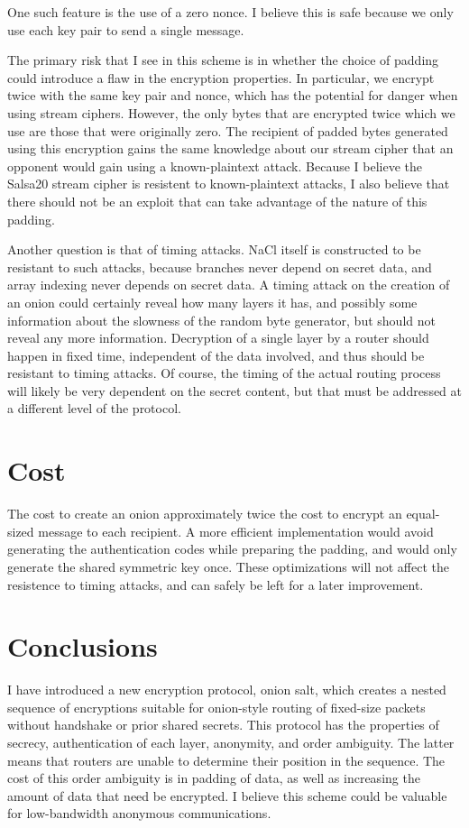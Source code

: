 \documentclass[letterpaper,twocolumn,amsmath,amssymb,pre,aps,10pt]{revtex4-1}
\begin{document}
One such feature is the use of a zero nonce.  I believe this is safe
because we only use each key pair to send a single message.

The primary risk that I see in this scheme is in whether the choice of
padding could introduce a flaw in the encryption properties.  In
particular, we encrypt twice with the same key pair and nonce, which
has the potential for danger when using stream ciphers.  However, the
only bytes that are encrypted twice which we use are those that were
originally zero.  The recipient of padded bytes generated using this
encryption gains the same knowledge about our stream cipher that an
opponent would gain using a known-plaintext attack.  Because I believe
the Salsa20 stream cipher is resistent to known-plaintext attacks, I
also believe that there should not be an exploit that can take
advantage of the nature of this padding.

Another question is that of timing attacks.  NaCl itself is
constructed to be resistant to such attacks, because branches never
depend on secret data, and array indexing never depends on secret
data.  A timing attack on the creation of an onion could certainly
reveal how many layers it has, and possibly some information about the
slowness of the random byte generator, but should not reveal any more
information.  Decryption of a single layer by a router should happen
in fixed time, independent of the data involved, and thus should be
resistant to timing attacks.  Of course, the timing of the actual
routing process will likely be very dependent on the secret content,
but that must be addressed at a different level of the protocol.

\section{Cost}

The cost to create an onion approximately twice the cost to encrypt an
equal-sized message to each recipient.  A more efficient
implementation would avoid generating the authentication codes while
preparing the padding, and would only generate the shared symmetric
key once.  These optimizations will not affect the resistence to
timing attacks, and can safely be left for a later improvement.

\section{Conclusions}

I have introduced a new encryption protocol, onion salt, which creates
a nested sequence of encryptions suitable for onion-style routing of
fixed-size packets without handshake or prior shared secrets.  This
protocol has the properties of secrecy, authentication of each layer,
anonymity, and order ambiguity.  The latter means that routers are
unable to determine their position in the sequence.  The cost of this
order ambiguity is in padding of data, as well as increasing the
amount of data that need be encrypted.  I believe this scheme could be
valuable for low-bandwidth anonymous communications.
\end{document}
